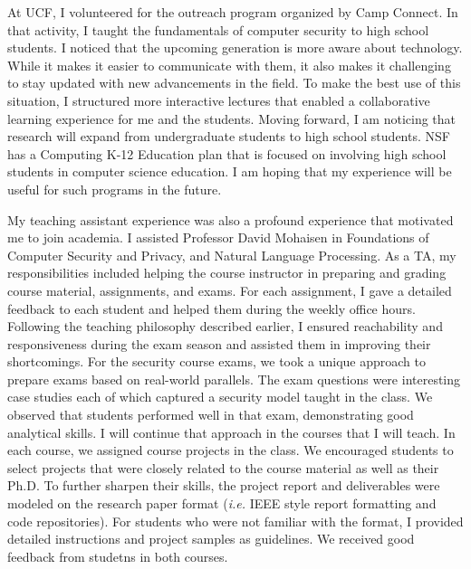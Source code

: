 \documentclass{NSF}
\newcommand{\ie}{{\em i.e.}\xspace}
\begin{document}
At UCF, I volunteered for the outreach program organized by Camp Connect. In that activity, I taught the fundamentals of computer security to high school students. I noticed that the upcoming generation is more aware about technology. While it makes it easier to communicate with them, it also makes it challenging to stay updated with new advancements in the field. To make the best use of this situation, I structured more interactive lectures that enabled a collaborative learning experience for me and the students. Moving forward, I am noticing that research will expand from undergraduate students to high school students. NSF has a Computing K-12 Education plan that is focused on involving high school students in computer science education. I am hoping that my experience will be useful for such programs in the future. 


My teaching assistant experience was also a profound experience that motivated me to join academia. I assisted Professor David Mohaisen in Foundations of Computer Security and Privacy, and Natural Language Processing. As a TA, my responsibilities included helping the course instructor in preparing and grading course material, assignments, and exams. For each assignment, I gave a detailed feedback to each student and helped them during the weekly office hours. Following the teaching philosophy described earlier, I ensured reachability and responsiveness during the exam season and assisted them in improving their shortcomings. For the security course exams, we took a unique approach to prepare exams based on real-world parallels. The exam questions were interesting case studies each of which captured a security model taught in the class. We observed that students performed well in that exam, demonstrating good analytical skills. I will continue that approach in the courses that I will teach. In each course, we assigned course projects in the class. We encouraged students to select projects that were closely related to the course material as well as their Ph.D. To further sharpen their skills, the project report and deliverables were modeled on the research paper format (\ie IEEE style report formatting and code repositories). For students who were not familiar with the format, I provided detailed instructions and project samples as guidelines. We received good feedback from studetns in both courses. 
\end{document}
